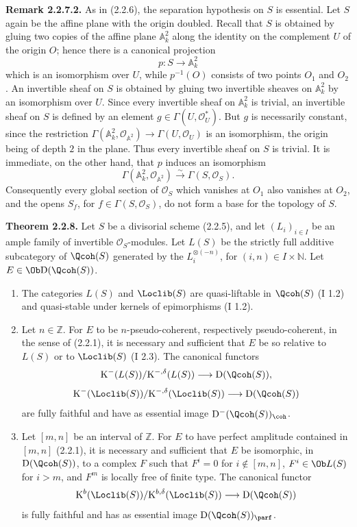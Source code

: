 \documentclass[11pt]{article}
\begin{document}
\textbf{Remark 2.2.7.2.} As in (2.2.6), the separation hypothesis on $S$ is essential. Let $S$ again be the affine plane with the origin doubled. Recall that $S$ is obtained by gluing two copies of the affine plane $\mathbb A^2_k$ along the identity on the complement $U$ of the origin $O$; hence there is a canonical projection
\[
p:S\longrightarrow\mathbb A^2_k
\]
which is an isomorphism over $U$, while $p^{-1}(O)$ consists of two points $O_1$ and $O_2$. An invertible sheaf on $S$ is obtained by gluing two invertible sheaves on $\mathbb A^2_k$ by an isomorphism over $U$. Since every invertible sheaf on $\mathbb A^2_k$ is trivial, an invertible sheaf on $S$ is defined by an element $g\in\Gamma(U,\mathcal O_U^*)$. But $g$ is necessarily constant, since the restriction $\Gamma(\mathbb A^2_k,\mathcal O_{\mathbb A^2})\to\Gamma(U,\mathcal O_U)$ is an isomorphism, the origin being of depth $2$ in the plane. Thus every invertible sheaf on $S$ is trivial. It is immediate, on the other hand, that $p$ induces an isomorphism
\[
\Gamma(\mathbb A^2_k,\mathcal O_{\mathbb A^2})\xrightarrow{\sim}\Gamma(S,\mathcal O_S).
\]
Consequently every global section of $\mathcal O_S$ which vanishes at $O_1$ also vanishes at $O_2$, and the opens $S_f$, for $f\in\Gamma(S,\mathcal O_S)$, do not form a base for the topology of $S$.

\textbf{Theorem 2.2.8.} Let $S$ be a divisorial scheme (2.2.5), and let $(L_i)_{i\in I}$ be an ample family of invertible $\mathcal O_S$-modules. Let $L(S)$ be the strictly full additive subcategory of $\Qcoh(S)$ generated by the $L_i^{\otimes(-n)}$, for $(i,n)\in I\times\mathbb N$. Let $E\in\Ob\mathrm D(\Qcoh(S))$.
\begin{enumerate}[label=\alph*)]
\item The categories $L(S)$ and $\Loclib(S)$ are quasi-liftable in $\Qcoh(S)$ (I 1.2) and quasi-stable under kernels of epimorphisms (I 1.2).
\item Let $n\in\mathbb Z$. For $E$ to be $n$-pseudo-coherent, respectively pseudo-coherent, in the sense of (2.2.1), it is necessary and sufficient that $E$ be so relative to $L(S)$ or to $\Loclib(S)$ (I 2.3). The canonical functors
\[
\mathrm K^{-}(L(S))/\mathrm K^{-,\delta}(L(S))\longrightarrow \mathrm D(\Qcoh(S)),
\]
\[
\mathrm K^{-}(\Loclib(S))/\mathrm K^{-,\delta}(\Loclib(S))\longrightarrow \mathrm D(\Qcoh(S))
\]
are fully faithful and have as essential image $\mathrm D^{-}(\Qcoh(S))_{\coh}$.
\item Let $[m,n]$ be an interval of $\mathbb Z$. For $E$ to have perfect amplitude contained in $[m,n]$ (2.2.1), it is necessary and sufficient that $E$ be isomorphic, in $\mathrm D(\Qcoh(S))$, to a complex $F$ such that $F^i=0$ for $i\notin[m,n]$, $F^i\in\Ob L(S)$ for $i>m$, and $F^m$ is locally free of finite type. The canonical functor
\[
\mathrm K^b(\Loclib(S))/\mathrm K^{b,\delta}(\Loclib(S))\longrightarrow \mathrm D(\Qcoh(S))
\]
is fully faithful and has as essential image $\mathrm D(\Qcoh(S))_{\parf}$.
\end{enumerate}
\end{document}
